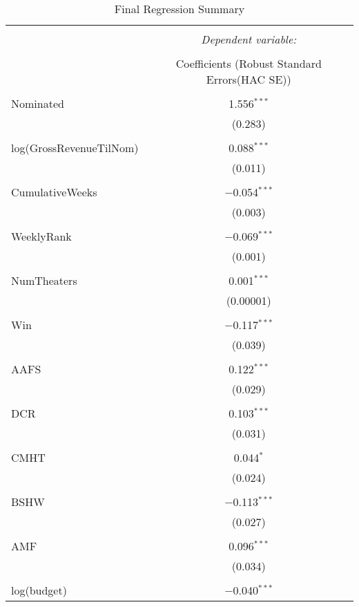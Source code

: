 \documentclass[10.7pt]{article} %
\begin{document}
\begin{table}[!htbp] \centering 
\scriptsize
  \caption{Final Regression Summary} 
  \label{} 
\begin{tabular}{@{\extracolsep{5pt}}lc} 
\\[-1.8ex]\hline 
\hline \\[-1.8ex] 
 & \multicolumn{1}{c}{\textit{Dependent variable:}} \\ 
\cline{2-2} 
\\[-1.8ex] & Coefficients (Robust Standard Errors(HAC SE)) \\ 
\hline \\[-1.8ex] 
 Nominated & 1.556$^{***}$ \\ 
  & (0.283) \\ 
  & \\ 
 log(GrossRevenueTilNom) & 0.088$^{***}$ \\ 
  & (0.011) \\ 
  & \\ 
 CumulativeWeeks & $-$0.054$^{***}$ \\ 
  & (0.003) \\ 
  & \\ 
 WeeklyRank & $-$0.069$^{***}$ \\ 
  & (0.001) \\ 
  & \\ 
 NumTheaters & 0.001$^{***}$ \\ 
  & (0.00001) \\ 
  & \\ 
 Win & $-$0.117$^{***}$ \\ 
  & (0.039) \\ 
  & \\ 
 AAFS & 0.122$^{***}$ \\ 
  & (0.029) \\ 
  & \\ 
 DCR & 0.103$^{***}$ \\ 
  & (0.031) \\ 
  & \\ 
 CMHT & 0.044$^{*}$ \\ 
  & (0.024) \\ 
  & \\ 
 BSHW & $-$0.113$^{***}$ \\ 
  & (0.027) \\ 
  & \\ 
 AMF & 0.096$^{***}$ \\ 
  & (0.034) \\ 
  & \\ 
 log(budget) & $-$0.040$^{***}$ \\ 

\end{tabular}
\end{table}
\end{document}
